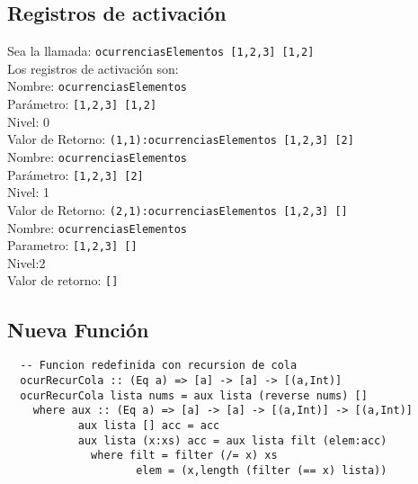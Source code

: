 \documentclass{article}
\begin{document}
\subsection*{Registros de activación}
Sea la llamada: \texttt{ocurrenciasElementos [1,2,3] [1,2]}\\
\newline
Los registros de activación son:\\
\newline
Nombre: \texttt{ocurrenciasElementos}\\
Parámetro: \texttt{[1,2,3] [1,2]}\\
Nivel: 0\\
Valor de Retorno: \texttt{(1,1):ocurrenciasElementos [1,2,3] [2]}\\
\newline
Nombre: \texttt{ocurrenciasElementos}\\
Parámetro: \texttt{[1,2,3] [2]}\\
Nivel: 1\\
Valor de Retorno: \texttt{(2,1):ocurrenciasElementos [1,2,3] []}\\
\newline
Nombre: \texttt{ocurrenciasElementos}\\
Parametro: \texttt{[1,2,3] []}\\
Nivel:2\\
Valor de retorno: \texttt{[]}\\
\newline
\subsection*{Nueva Función}

\begin{lstlisting}
  -- Funcion redefinida con recursion de cola
  ocurRecurCola :: (Eq a) => [a] -> [a] -> [(a,Int)]
  ocurRecurCola lista nums = aux lista (reverse nums) []
    where aux :: (Eq a) => [a] -> [a] -> [(a,Int)] -> [(a,Int)]
           aux lista [] acc = acc
           aux lista (x:xs) acc = aux lista filt (elem:acc)
             where filt = filter (/= x) xs
                    elem = (x,length (filter (== x) lista))
\end{lstlisting}
\end{document}
